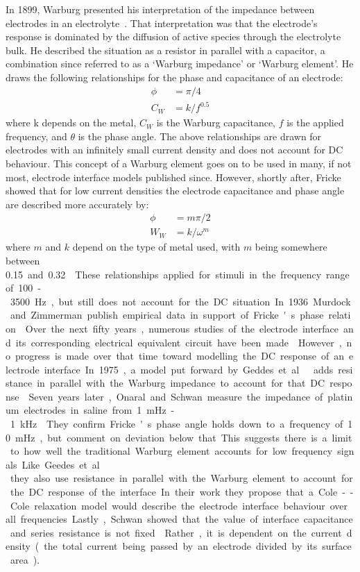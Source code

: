     In 1899, Warburg presented his interpretation of the impedance between electrodes in an electrolyte~\cite{Warburg1899}.
    That interpretation was that the electrode's response is dominated by the diffusion of active species through the electrolyte bulk.
    He described the situation as a resistor in parallel with a capacitor, a combination since referred to as a `Warburg impedance' or `Warburg element'.
    He draws the following relationships for the phase and capacitance of an electrode:
    \begin{align}
      \phi &= \pi / 4\\
      C_W &= k/f^{0.5}
    \end{align}
    where k depends on the metal, $C_W$ is the Warburg capacitance, $f$ is the applied frequency, and $\theta$ is the phase angle.
    The above relationships are drawn for electrodes with an infinitely small current density and does not account for DC behaviour.
    This concept of a Warburg element goes on to be used in many, if not most, electrode interface models published since.
    However, shortly after, Fricke showed that for low current densities the electrode capacitance and phase angle are described more accurately by:
    \begin{align}
      \phi &= m \pi / 2\\
      W_W &= k/\omega^m
    \end{align}
    where $m$ and $k$ depend on the type of metal used, with $m$ being somewhere between \SI{0.15} and \SI{0.32}~\cite{Fricke1932}.
    These relationships applied for stimuli in the frequency range of \SI{100}-\SI{3500}{\hertz}, but still does not account for the DC situation.
    In 1936 Murdock and Zimmerman publish empirical data in support of Fricke's phase relation~\cite{Murdock1936}.
    Over the next fifty years, numerous studies of the electrode interface and its corresponding electrical equivalent circuit have been made~\cite{Randles1947,Epelboin1973,Sluyters-Rehbach1970}.
    However, no progress is made over that time toward modelling the DC response of an electrode interface.
    In 1975, a model put forward by Geddes et. al\ adds resistance in parallel with the Warburg impedance to account for that DC response~\cite{Geddes1975}.
    Seven years later, Onaral and Schwan measure the impedance of platinum electrodes in saline from \SI{1}{\milli\hertz}-\SI{1}{\kilo\hertz}~\cite{Onaral1982}.
    They confirm Fricke's phase angle holds down to a frequency of \SI{10}{\milli\hertz}, but comment on deviation below that.
    This suggests there is a limit to how well the traditional Warburg element accounts for low frequency signals.
    Like Geedes et. al\, they also use resistance in parallel with the Warburg element to account for the DC response of the interface.
    In their work they propose that a Cole--Cole relaxation model would describe the electrode interface behaviour over all frequencies.
    Lastly, Schwan showed that the value of interface capacitance and series resistance is not fixed~\cite{Schwan1968}.
    Rather, it is dependent on the current density (the total current being passed by an electrode divided by its surface area).

